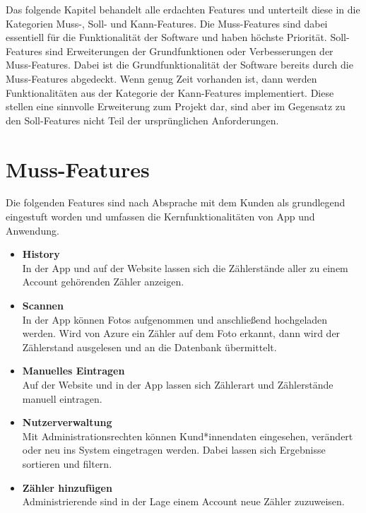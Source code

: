 
Das folgende Kapitel behandelt alle erdachten Features und unterteilt diese in die Kategorien Muss-, Soll- und Kann-Features. 
Die Muss-Features sind dabei essentiell für die Funktionalität der Software und haben höchste Priorität.
Soll-Features sind Erweiterungen der Grundfunktionen oder Verbesserungen der Muss-Features. Dabei ist die Grundfunktionalität der Software bereits durch die Muss-Features abgedeckt.
Wenn genug Zeit vorhanden ist, dann werden Funktionalitäten aus der Kategorie der Kann-Features implementiert. 
Diese stellen eine sinnvolle Erweiterung zum Projekt dar, sind aber im Gegensatz zu den Soll-Features nicht Teil der ursprünglichen Anforderungen.
\section{Muss-Features}
Die folgenden Features sind nach Absprache mit dem Kunden als grundlegend eingestuft worden und umfassen die Kernfunktionalitäten von App und Anwendung.
\begin{itemize}
\item \textbf{History} \hfill \\
	In der App und auf der Website lassen sich die Zählerstände aller zu einem Account gehörenden Zähler anzeigen.
\item \textbf{Scannen} \hfill \\
	In der App können Fotos aufgenommen und anschließend hochgeladen werden. 
	Wird von Azure ein Zähler auf dem Foto erkannt, dann wird der Zählerstand ausgelesen und an die Datenbank übermittelt.
\item \textbf{Manuelles Eintragen} \hfill \\
	Auf der Website und in der App lassen sich Zählerart und Zählerstände manuell eintragen.
\item \textbf{Nutzerverwaltung} \hfill \\
	Mit Administrationsrechten können Kund*innendaten eingesehen, verändert oder neu ins System eingetragen werden.
	Dabei lassen sich Ergebnisse sortieren und filtern.
\item \textbf{Zähler hinzufügen} \hfill \\
	Administrierende sind in der Lage einem Account neue Zähler zuzuweisen.	
\end{itemize}
\newpage
